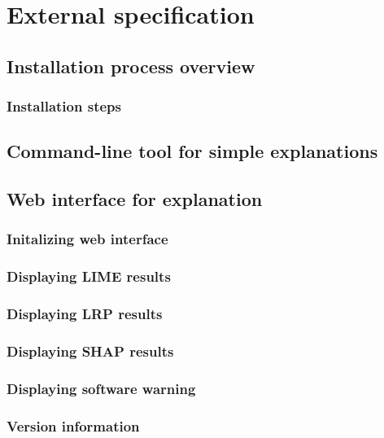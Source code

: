 \documentclass[
    bindingoffset=5mm,  %
    footnoteindent=3mm, %
    hyphenation=true    %
]{src/wut-thesis}
\begin{document}
%
%
\clearpage %
\section{External specification} \label{ch:externalSpec}

\subsection{Installation process overview}
\subsubsection{Installation steps}

\subsection{Command-line tool for simple explanations} \label{ch4:CmdTool}

\subsection{Web interface for explanation}
\subsubsection{Initalizing web interface}
\subsubsection{Displaying LIME results}
\subsubsection{Displaying LRP results}
\subsubsection{Displaying SHAP results}
\subsubsection{Displaying software warning} \label{ch4:NotificationPanel}
\subsubsection{Version information}
\end{document}
